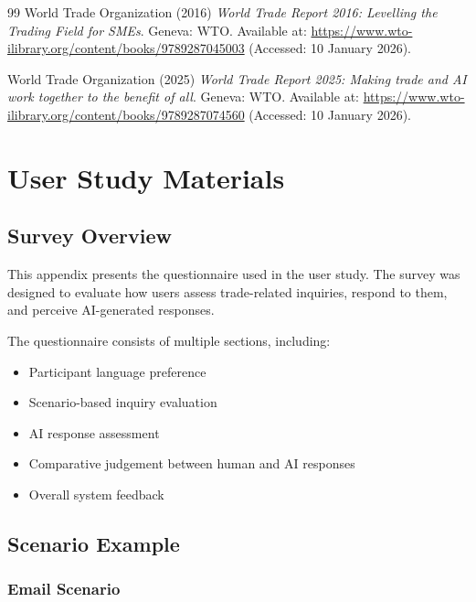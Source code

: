 \documentclass[12pt,a4paper]{report}
\begin{document}
\begin{thebibliography}{99}
World Trade Organization (2016) \textit{World Trade Report 2016: Levelling the Trading Field for SMEs}. Geneva: WTO. Available at: \url{https://www.wto-ilibrary.org/content/books/9789287045003} (Accessed: 10 January 2026).

World Trade Organization (2025) \textit{World Trade Report 2025: Making trade and AI work together to the benefit of all}. Geneva: WTO. Available at: \url{https://www.wto-ilibrary.org/content/books/9789287074560} (Accessed: 10 January 2026).

\end{thebibliography}
\endgroup


\appendix

\chapter{User Study Materials}

\section{Survey Overview}

This appendix presents the questionnaire used in the user study. The survey was designed to evaluate how users assess trade-related inquiries, respond to them, and perceive AI-generated responses.

The questionnaire consists of multiple sections, including:
\begin{itemize}
    \item Participant language preference
    \item Scenario-based inquiry evaluation
    \item AI response assessment
    \item Comparative judgement between human and AI responses
    \item Overall system feedback
\end{itemize}


\section{Scenario Example}

\subsection{Email Scenario}
\end{document}
